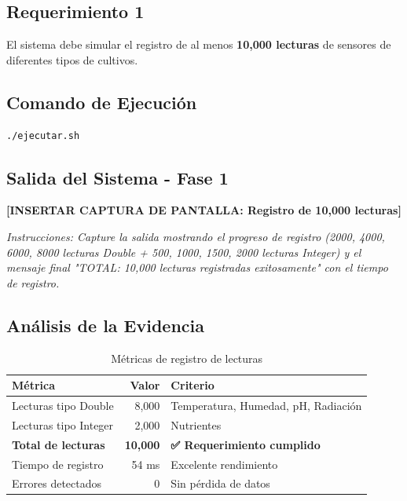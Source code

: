 \documentclass[12pt,a4paper]{article}
\begin{document}
\subsection{Requerimiento 1}

\begin{tcolorbox}[colback=yellow!10,colframe=orange,title=\textbf{RF-001: Simulación de Lecturas}]
El sistema debe simular el registro de al menos \textbf{10,000 lecturas} de sensores de diferentes tipos de cultivos.
\end{tcolorbox}

\subsection{Comando de Ejecución}

\begin{tcolorbox}[colback=gray!5,colframe=gray!75!black,title=\textbf{Comando Ejecutado}]
\begin{lstlisting}[style=bashstyle]
./ejecutar.sh
\end{lstlisting}
\end{tcolorbox}

\subsection{Salida del Sistema - Fase 1}

\begin{tcolorbox}[colback=green!5,colframe=green!75!black,title=\textbf{FASE 1: REGISTRO DE 10,000 LECTURAS}]
\vspace{0.5cm}
\textbf{[INSERTAR CAPTURA DE PANTALLA: Registro de 10,000 lecturas]}

\textit{Instrucciones: Capture la salida mostrando el progreso de registro (2000, 4000, 6000, 8000 lecturas Double + 500, 1000, 1500, 2000 lecturas Integer) y el mensaje final "TOTAL: 10,000 lecturas registradas exitosamente" con el tiempo de registro.}
\vspace{0.5cm}
\end{tcolorbox}

\subsection{Análisis de la Evidencia}

\begin{table}[h]
\centering
\begin{tabular}{|l|r|l|}
\hline
\rowcolor{evidenceblue!20}
\textbf{Métrica} & \textbf{Valor} & \textbf{Criterio} \\
\hline
Lecturas tipo Double & 8,000 & Temperatura, Humedad, pH, Radiación \\
Lecturas tipo Integer & 2,000 & Nutrientes \\
\textbf{Total de lecturas} & \textbf{10,000} & \textbf{✅ Requerimiento cumplido} \\
Tiempo de registro & 54 ms & Excelente rendimiento \\
Errores detectados & 0 & Sin pérdida de datos \\
\hline
\end{tabular}
\caption{Métricas de registro de lecturas}
\label{tab:registro}
\end{table}
\end{document}
